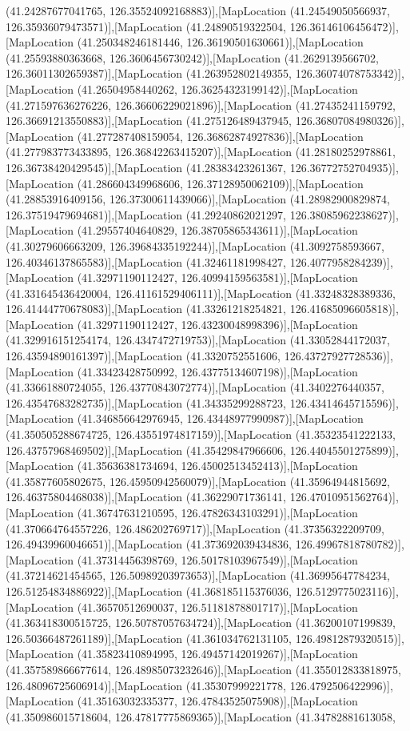(41.24287677041765, 126.35524092168883)],[MapLocation (41.24549050566937, 126.35936079473571)],[MapLocation (41.24890519322504, 126.36146106456472)],[MapLocation (41.250348246181446, 126.36190501630661)],[MapLocation (41.25593880363668, 126.3606456730242)],[MapLocation (41.2629139566702, 126.36011302659387)],[MapLocation (41.263952802149355, 126.36074078753342)],[MapLocation (41.26504958440262, 126.36254323199142)],[MapLocation (41.271597636276226, 126.36606229021896)],[MapLocation (41.27435241159792, 126.36691213550883)],[MapLocation (41.275126489437945, 126.36807084980326)],[MapLocation (41.277287408159054, 126.36862874927836)],[MapLocation (41.277983773433895, 126.36842263415207)],[MapLocation (41.28180252978861, 126.36738420429545)],[MapLocation (41.28383423261367, 126.36772752704935)],[MapLocation (41.286604349968606, 126.37128950062109)],[MapLocation (41.28853916409156, 126.37300611439066)],[MapLocation (41.28982900829874, 126.37519479694681)],[MapLocation (41.29240862021297, 126.38085962238627)],[MapLocation (41.29557404640829, 126.38705865343611)],[MapLocation (41.30279606663209, 126.39684335192244)],[MapLocation (41.3092758593667, 126.40346137865583)],[MapLocation (41.32461181998427, 126.4077958284239)],[MapLocation (41.32971190112427, 126.40994159563581)],[MapLocation (41.331645436420004, 126.41161529406111)],[MapLocation (41.33248328389336, 126.41444770678083)],[MapLocation (41.33261218254821, 126.41685096605818)],[MapLocation (41.32971190112427, 126.43230048998396)],[MapLocation (41.329916151254174, 126.4347472719753)],[MapLocation (41.33052844172037, 126.43594890161397)],[MapLocation (41.3320752551606, 126.43727927728536)],[MapLocation (41.33423428750992, 126.43775134607198)],[MapLocation (41.33661880724055, 126.43770843072774)],[MapLocation (41.3402276440357, 126.43547683282735)],[MapLocation (41.34335299288723, 126.43414645715596)],[MapLocation (41.346856642976945, 126.43448977990987)],[MapLocation (41.350505288674725, 126.43551974817159)],[MapLocation (41.35323541222133, 126.43757968469502)],[MapLocation (41.35429847966606, 126.44045501275899)],[MapLocation (41.35636381734694, 126.45002513452413)],[MapLocation (41.35877605802675, 126.45950942560079)],[MapLocation (41.35964944815692, 126.46375804468038)],[MapLocation (41.36229071736141, 126.47010951562764)],[MapLocation (41.36747631210595, 126.47826343103291)],[MapLocation (41.370664764557226, 126.486202769717)],[MapLocation (41.37356322209709, 126.49439960046651)],[MapLocation (41.373692039434836, 126.49967818780782)],[MapLocation (41.37314456398769, 126.50178103967549)],[MapLocation (41.37214621454565, 126.50989203973653)],[MapLocation (41.36995647784234, 126.51254834886922)],[MapLocation (41.368185115376036, 126.5129775023116)],[MapLocation (41.36570512690037, 126.51181878801717)],[MapLocation (41.363418300515725, 126.50787057634724)],[MapLocation (41.36200107199839, 126.50366487261189)],[MapLocation (41.361034762131105, 126.49812879320515)],[MapLocation (41.35823410894995, 126.49457142019267)],[MapLocation (41.357589866677614, 126.48985073232646)],[MapLocation (41.355012833818975, 126.48096725606914)],[MapLocation (41.35307999221778, 126.4792506422996)],[MapLocation (41.35163032335377, 126.47843525075908)],[MapLocation (41.350986015718604, 126.47817775869365)],[MapLocation (41.34782881613058, 